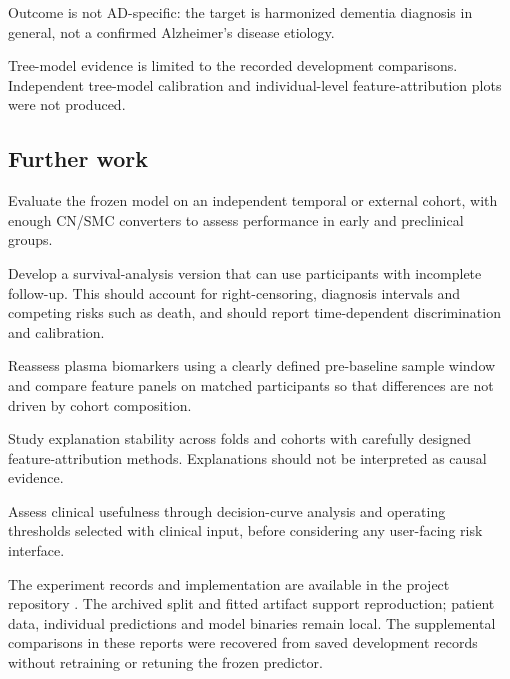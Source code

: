 \documentclass[11pt,a4paper]{article}
\begin{document}
Outcome is not AD-specific: the target is harmonized dementia diagnosis in general, not a confirmed Alzheimer's disease etiology.

Tree-model evidence is limited to the recorded development comparisons. Independent tree-model calibration and individual-level feature-attribution plots were not produced.

\subsection{Further work}
Evaluate the frozen model on an independent temporal or external cohort, with enough CN/SMC converters to assess performance in early and preclinical groups.

Develop a survival-analysis version that can use participants with incomplete follow-up. This should account for right-censoring, diagnosis intervals and competing risks such as death, and should report time-dependent discrimination and calibration.

Reassess plasma biomarkers using a clearly defined pre-baseline sample window and compare feature panels on matched participants so that differences are not driven by cohort composition.

Study explanation stability across folds and cohorts with carefully designed feature-attribution methods. Explanations should not be interpreted as causal evidence.

Assess clinical usefulness through decision-curve analysis and operating thresholds selected with clinical input, before considering any user-facing risk interface.

The experiment records and implementation are available in the project repository \cite{project}. The archived split and fitted artifact support reproduction; patient data, individual predictions and model binaries remain local. The supplemental comparisons in these reports were recovered from saved development records without retraining or retuning the frozen predictor.
\end{document}
